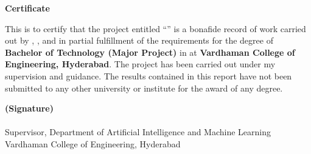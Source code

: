 \thispagestyle{empty}
\begin{center}
\vspace*{1cm}
{\Large \textbf{Certificate}}
\end{center}

\vspace{1cm}

\noindent
This is to certify that the project entitled ``\thesistitle'' is a bonafide record of work carried out by \textbf{\studentA}, \textbf{\studentB}, and \textbf{\studentC} in partial fulfillment of the requirements for the degree of \textbf{Bachelor of Technology (Major Project)} in \textbf{\thesisdept} at \textbf{Vardhaman College of Engineering, Hyderabad}. The project has been carried out under my supervision and guidance. The results contained in this report have not been submitted to any other university or institute for the award of any degree.

\vspace{3cm}

\begin{flushright}
\textbf{(Signature)}\\[0.5cm]
\textbf{\guidename}\\
Supervisor, Department of Artificial Intelligence and Machine Learning\\
Vardhaman College of Engineering, Hyderabad
\end{flushright}

\clearpage
